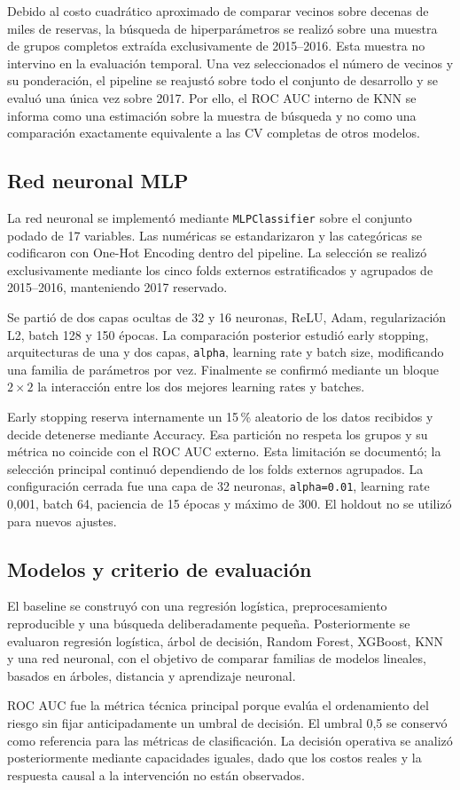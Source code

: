 Debido al costo cuadrático aproximado de comparar vecinos sobre decenas de
miles de reservas, la búsqueda de hiperparámetros se realizó sobre una
muestra de grupos completos extraída exclusivamente de 2015--2016. Esta muestra
no intervino en la evaluación temporal. Una vez seleccionados el número de
vecinos y su ponderación, el pipeline se reajustó sobre todo el conjunto de
desarrollo y se evaluó una única vez sobre 2017. Por ello, el ROC AUC interno
de KNN se informa como una estimación sobre la muestra de búsqueda y no como
una comparación exactamente equivalente a las CV completas de otros modelos.

\subsection{Red neuronal MLP}

La red neuronal se implementó mediante \texttt{MLPClassifier} sobre el conjunto
podado de 17 variables. Las numéricas se estandarizaron y las categóricas se
codificaron con One-Hot Encoding dentro del pipeline. La selección se realizó
exclusivamente mediante los cinco folds externos estratificados y agrupados de
2015--2016, manteniendo 2017 reservado.

Se partió de dos capas ocultas de 32 y 16 neuronas, ReLU, Adam, regularización
L2, batch 128 y 150 épocas. La comparación posterior estudió early stopping,
arquitecturas de una y dos capas, \texttt{alpha}, learning rate y batch size,
modificando una familia de parámetros por vez. Finalmente se confirmó mediante
un bloque $2\times2$ la interacción entre los dos mejores learning rates y
batches.

Early stopping reserva internamente un 15\,\% aleatorio de los datos recibidos
y decide detenerse mediante Accuracy. Esa partición no respeta los grupos y su
métrica no coincide con el ROC AUC externo. Esta limitación se documentó; la
selección principal continuó dependiendo de los folds externos agrupados. La
configuración cerrada fue una capa de 32 neuronas, \texttt{alpha=0.01}, learning
rate 0,001, batch 64, paciencia de 15 épocas y máximo de 300. El holdout no se
utilizó para nuevos ajustes.

\subsection{Modelos y criterio de evaluación}

El baseline se construyó con una regresión logística, preprocesamiento
reproducible y una búsqueda deliberadamente pequeña. Posteriormente se evaluaron regresión
logística, árbol de decisión, Random Forest, XGBoost, KNN y una red neuronal,
con el objetivo de comparar familias de modelos lineales, basados en árboles,
distancia y aprendizaje neuronal.

ROC AUC fue la métrica técnica principal porque evalúa el ordenamiento del
riesgo sin fijar anticipadamente un umbral de decisión. El umbral 0,5 se
conservó como referencia para las métricas de clasificación. La decisión
operativa se analizó posteriormente mediante capacidades iguales, dado que los
costos reales y la respuesta causal a la intervención no están observados.
